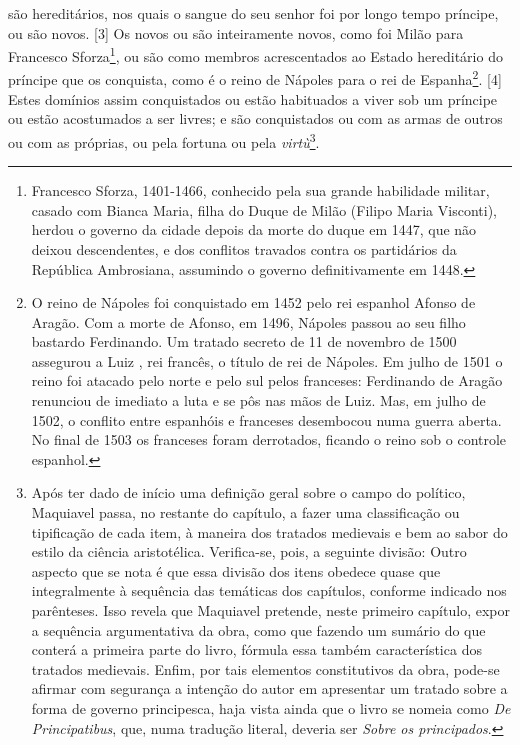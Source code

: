 são hereditários, nos quais o sangue do seu senhor foi por longo tempo
príncipe, ou são novos. {[}3{]} Os novos ou são inteiramente novos, como
foi Milão para Francesco Sforza\footnote{Francesco Sforza, 1401-1466,
  conhecido pela sua grande habilidade militar, casado com Bianca Maria,
  filha do Duque de Milão (Filipo Maria Visconti), herdou o governo da
  cidade depois da morte do duque em 1447, que não deixou descendentes,
  e dos conflitos travados contra os partidários da República
  Ambrosiana, assumindo o governo definitivamente em 1448.}, ou são como
membros acrescentados ao Estado hereditário do príncipe que os
conquista, como é o reino de Nápoles para o rei de Espanha\footnote{O
  reino de Nápoles foi conquistado em 1452 pelo rei espanhol Afonso  de
  Aragão. Com a morte de Afonso, em 1496, Nápoles passou ao seu filho
  bastardo Ferdinando. Um tratado secreto de 11 de novembro de 1500
  assegurou a Luiz , rei francês, o título de rei de Nápoles. Em
  julho de 1501 o reino foi atacado pelo norte e pelo sul pelos
  franceses: Ferdinando  de Aragão renunciou de imediato a luta e se
  pôs nas mãos de Luiz. Mas, em julho de 1502, o conflito entre
  espanhóis e franceses desembocou numa guerra aberta. No final de 1503
  os franceses foram derrotados, ficando o reino sob o controle
  espanhol.}. {[}4{]} Estes domínios assim conquistados ou estão
habituados a viver sob um príncipe ou estão acostumados a ser livres; e
são conquistados ou com as armas de outros ou com as próprias, ou pela
fortuna ou pela \emph{virtù}\footnote{Após ter dado de início uma
  definição geral sobre o campo do político, Maquiavel passa, no
  restante do capítulo, a fazer uma classificação ou tipificação de cada
  item, à maneira dos tratados medievais e bem ao sabor do estilo da
  ciência aristotélica. Verifica-se, pois, a seguinte divisão:
 Outro aspecto que se nota é que essa divisão dos itens obedece quase
  que integralmente à sequência das temáticas dos capítulos, conforme
  indicado nos parênteses. Isso revela que Maquiavel pretende, neste
  primeiro capítulo, expor a sequência argumentativa da obra, como que
  fazendo um sumário do que conterá a primeira parte do livro, fórmula
  essa também característica dos tratados medievais. Enfim, por tais
  elementos constitutivos da obra, pode-se afirmar com segurança a
  intenção do autor em apresentar um tratado sobre a forma de governo
  principesca, haja vista ainda que o livro se nomeia como \emph{De
  Principatibus}, que, numa tradução literal, deveria ser \emph{Sobre os
  principados}.}.
